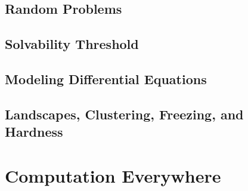 \documentclass[]{article}
\begin{document}
\subsection{Random Problems}

\subsection{Solvability Threshold}

\subsection{Modeling Differential Equations}

\subsection{Landscapes, Clustering, Freezing, and Hardness }


\section{Computation Everywhere}
\cite[Chapter 7]{moore2011nature}


\printglossaries

 

\raggedright
{}

\end{document}
